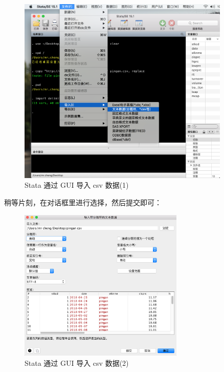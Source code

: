 \documentclass[]{ctexbook}
\begin{document}
\begin{figure}

{\centering \includegraphics[width=0.9\textwidth]{assets/csvgui1} 

}

\caption{Stata 通过 GUI 导入 csv 数据(1)}\label{fig:csvgui1}
\end{figure}

稍等片刻，在对话框里进行选择，然后提交即可：

\begin{figure}

{\centering \includegraphics[width=0.7\textwidth]{assets/csvgui2} 

}

\caption{Stata 通过 GUI 导入 csv 数据(2)}\label{fig:csvgui2}
\end{figure}
\end{document}
